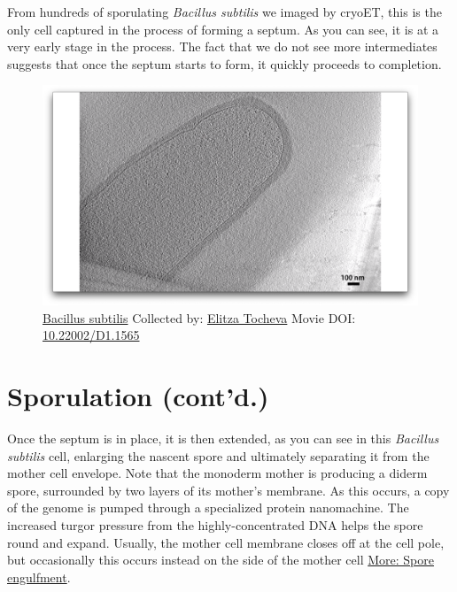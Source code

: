 \documentclass[]{tufte-book}
\begin{document}
From hundreds of sporulating \emph{Bacillus subtilis} we imaged by
cryoET, this is the only cell captured in the process of forming a
septum. As you can see, it is at a very early stage in the process. The
fact that we do not see more intermediates suggests that once the septum
starts to form, it quickly proceeds to completion.





\begin{figure}
\includegraphics{movie_stills/8_5a} \caption[\protect\hyperlink{tree}{Bacillus subtilis} Collected by:
\protect\hyperlink{elitza_tocheva}{Elitza Tocheva} Movie DOI:
\href{https://doi.org/10.22002/D1.1565}{10.22002/D1.1565}]{\protect\hyperlink{tree}{Bacillus subtilis} Collected by:
\protect\hyperlink{elitza_tocheva}{Elitza Tocheva} Movie DOI:
\href{https://doi.org/10.22002/D1.1565}{10.22002/D1.1565}}\label{fig:8-5a}
\end{figure}

\section{Sporulation (cont'd.)}\label{sporulation-contd.}

Once the septum is in place, it is then extended, as you can see in this
\emph{Bacillus subtilis} cell, enlarging the nascent spore and
ultimately separating it from the mother cell envelope. Note that the
monoderm mother is producing a diderm spore, surrounded by two layers of
its mother's membrane. As this occurs, a copy of the genome is pumped
through a specialized protein nanomachine. The increased turgor pressure
from the highly-concentrated DNA helps the spore round and expand.
Usually, the mother cell membrane closes off at the cell pole, but
occasionally this occurs instead on the side of the mother cell
\protect\hyperlink{Spore_engulfment}{More: Spore engulfment}.
\end{document}
